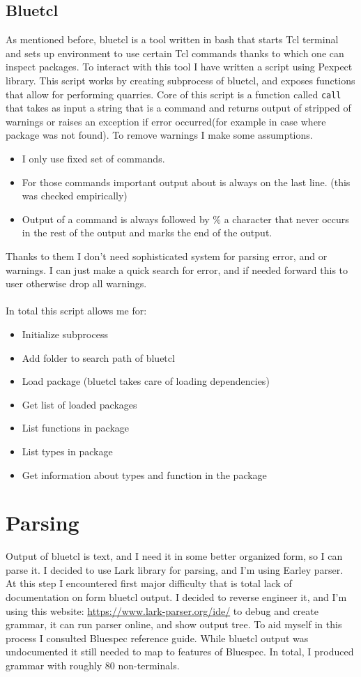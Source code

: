 \documentclass[14pt]{report}
\begin{document}
\subsection{Bluetcl}
As mentioned before, bluetcl is a tool written in bash that starts Tcl terminal and sets up environment to use certain Tcl commands thanks to which one can inspect packages. To interact with this tool I have written a script using Pexpect library. This script works by creating subprocess of bluetcl, and exposes functions that allow for performing quarries. Core of this script is a function called \verb!call! that takes as input a string that is a command and returns output of stripped of warnings or raises an exception if error occurred(for example in case where package was not found). To remove warnings I make some assumptions.
\begin{itemize}
    \item I only use fixed set of commands.
    \item For those commands important output about is always on the last line. (this was checked empirically)
    \item Output of a command is always followed by $\%$ a character that never occurs in the rest of the output and marks the end of the output.
\end{itemize}
Thanks to them I don't need sophisticated system for parsing error, and or warnings. I can just make a quick search for error, and if needed forward this to user otherwise drop all warnings.
\\ 
\\
In total this script allows me for:
\begin{itemize}
    \item Initialize subprocess
    \item Add folder to search path of bluetcl
    \item Load package (bluetcl takes care of loading dependencies)
    \item Get list of loaded packages
    \item List functions in package
    \item List types in package
    \item Get information about types and function in the package
\end{itemize}

\section{Parsing}
Output of bluetcl is text, and I need it in some better organized form, so I can parse it. I decided to use Lark library for parsing, and I'm using Earley parser. At this step I encountered first major difficulty that is total lack of documentation on form bluetcl output. I decided to reverse engineer it, and I'm using this website: \href{https://www.lark-parser.org/ide/}{https://www.lark-parser.org/ide/} to debug and create grammar, it can run parser online, and show output tree. To aid myself in this process I consulted Bluespec reference guide. While bluetcl output was undocumented it still needed to map to features of Bluespec. In total, I produced grammar with roughly 80 non-terminals.
\end{document}
